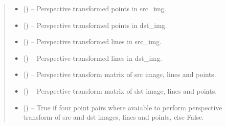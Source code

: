 \documentclass[letterpaper,10pt,english]{sphinxmanual}
\begin{document}
\begin{fulllineitems}
\begin{quote}
\begin{description}
\begin{itemize}
\item {} 
 () -- Perspective transformed points in src\_img.

\item {} 
 () -- Perspective transformed points in dst\_img.

\item {} 
 () -- Perspective transformed lines in src\_img.

\item {} 
 () -- Perspective transformed lines in dst\_img.

\item {} 
 () -- Perspective transform matrix of src image, lines and points.

\item {} 
 () -- Perspective transform matrix of dst image, lines and points.

\item {} 
 () -- True if four point pairs where avaiable to perform perspective
transform of src and dst images, lines and points, else False.

\end{itemize}


\end{description}\end{quote}

\end{fulllineitems}

\end{document}
